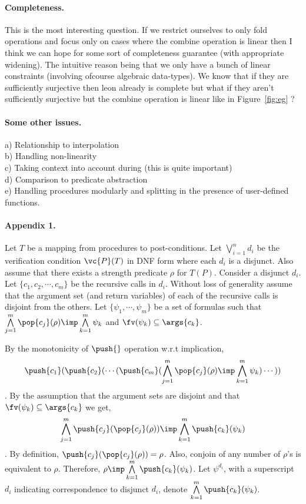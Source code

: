 \paragraph{Completeness.}

This is the most interesting question. If we restrict ourselves to only fold operations
and focus only on cases where the combine operation is linear then I think we can 
hope for some sort of completeness guarantee (with appropriate widening). 
The intuitive reason being that we only have a bunch of linear constraints 
(involving ofcourse algebraic data-types).
We know that if they are sufficiently surjective then leon already is complete
but what if they aren't sufficiently surjective but the combine operation is linear
\eg{} like in Figure~\ref{fig:eg} ?

\paragraph{Some other issues.}

a) Relationship to interpolation \\
b) Handling non-linearity \\
c) Taking context into account during \SG (this is quite important) \\
d) Comparison to predicate abstraction \\
e) Handling procedures modularly and splitting in the presence of user-defined functions.

\paragraph{Appendix 1.} \label{sec:split-proof}

Let $T$ be a mapping from procedures to post-conditions.
Let $\bigvee \limits_{i=1}^{n} d_i$ be the verification condition $\vc{P}(T)$ in DNF form where each $d_i$
is a disjunct.
Also assume that there exists a strength predicate $\rho$ for $T(P)$.
Consider a disjunct $d_i$.
Let $\{ c_1,c_2,\cdots,c_m \}$ be the recursive calls in $d_i$.
Without loss of generality assume that the argument set (and return variables) of 
each of the recursive calls is disjoint from the others.
Let $\{ \psi_1, \cdots, \psi_m \}$ be a set of formulas such that 
$\bigwedge \limits_{j=1}^{m} \pop{c_j}(\rho) \imp \bigwedge \limits_{k=1}^{m} \psi_k$
and $\fv(\psi_k) \subseteq \args{c_k}$.

By the monotonicity of $\push{}$  operation w.r.t implication,
\[ \push{c_1}(\push{c_2}(\cdots(\push{c_m}(\bigwedge \limits_{j=1}^{m} \pop{c_j}(\rho) 
\imp \bigwedge \limits_{k=1}^{m} \psi_k)\cdots)) \].
%
By the assumption that the argument sets are disjoint and that 
$\fv(\psi_k) \subseteq \args{c_k}$ we get,
%
\[\bigwedge \limits_{j=1}^{m} \push{c_j}(\pop{c_j}(\rho)) 
\imp \bigwedge \limits_{k=1}^{m} \push{c_k}(\psi_k) \].
%
By definition, $\push{c_j}(\pop{c_j}(\rho)) = \rho$.
Also, conjoin  of any number of $\rho$'s is equivalent to $\rho$.
Therefore, $\rho \imp \bigwedge \limits_{k=1}^{m} \push{c_k}(\psi_k)$.
Let $\psi^{d_i}$, with a superscript $d_i$ indicating correspondence to disjunct $d_i$, 
denote $\bigwedge \limits_{k=1}^{m} \push{c_k}(\psi_k)$.

